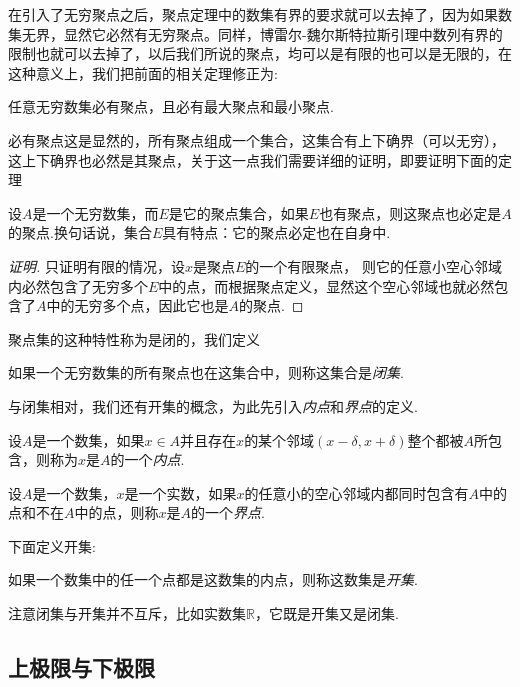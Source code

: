 在引入了无穷聚点之后，聚点定理中的数集有界的要求就可以去掉了，因为如果数集无界，显然它必然有无穷聚点。同样，博雷尔-魏尔斯特拉斯引理中数列有界的限制也就可以去掉了，以后我们所说的聚点，均可以是有限的也可以是无限的，在这种意义上，我们把前面的相关定理修正为:
\begin{theorem}
  任意无穷数集必有聚点，且必有最大聚点和最小聚点.
\end{theorem}
必有聚点这是显然的，所有聚点组成一个集合，这集合有上下确界（可以无穷），这上下确界也必然是其聚点，关于这一点我们需要详细的证明，即要证明下面的定理
\begin{theorem}
  设$A$是一个无穷数集，而$E$是它的聚点集合，如果$E$也有聚点，则这聚点也必定是$A$的聚点.换句话说，集合$E$具有特点：它的聚点必定也在自身中.
\end{theorem}

\begin{proof}[证明]
 只证明有限的情况，设$x$是聚点$E$的一个有限聚点， 则它的任意小空心邻域内必然包含了无穷多个$E$中的点，而根据聚点定义，显然这个空心邻域也就必然包含了$A$中的无穷多个点，因此它也是$A$的聚点.
\end{proof}

聚点集的这种特性称为是闭的，我们定义
\begin{definition}
  如果一个无穷数集的所有聚点也在这集合中，则称这集合是\emph{闭集}.
\end{definition}

与闭集相对，我们还有开集的概念，为此先引入\emph{内点}和\emph{界点}的定义.
\begin{definition}
  设$A$是一个数集，如果$x \in A$并且存在$x$的某个邻域$(x-\delta,x+\delta)$整个都被$A$所包含，则称为$x$是$A$的一个\emph{内点}.
\end{definition}

\begin{definition}
  设$A$是一个数集，$x$是一个实数，如果$x$的任意小的空心邻域内都同时包含有$A$中的点和不在$A$中的点，则称$x$是$A$的一个\emph{界点}.
\end{definition}

下面定义开集:
\begin{definition}
  如果一个数集中的任一个点都是这数集的内点，则称这数集是\emph{开集}.
\end{definition}

注意闭集与开集并不互斥，比如实数集$\mathbb{R}$，它既是开集又是闭集.

\subsection{上极限与下极限}
\label{sec:upper-limit-and-lower-limit}

